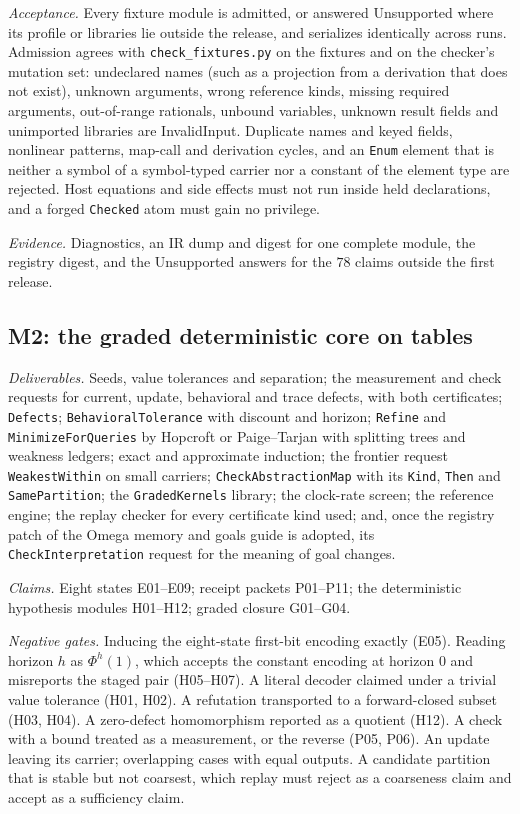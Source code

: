 \documentclass[11pt]{article}
\newcommand{\code}[1]{\texttt{#1}}
\begin{document}
\emph{Acceptance.} Every fixture module is admitted, or answered Unsupported where its profile or
libraries lie outside the release, and serializes identically across runs. Admission agrees with
\code{check\_fixtures.py} on the fixtures and on the checker's mutation set: undeclared names
(such as a projection from a derivation that does not exist), unknown arguments, wrong reference
kinds, missing required arguments, out-of-range rationals, unbound variables, unknown result fields
and unimported libraries are InvalidInput. Duplicate names and keyed fields, nonlinear patterns,
map-call and derivation cycles, and an \code{Enum} element that is neither a symbol of a symbol-typed
carrier nor a constant of the element type are rejected. Host equations and side effects must not run
inside held declarations, and a forged \code{Checked} atom must gain no privilege.

\emph{Evidence.} Diagnostics, an IR dump and digest for one complete module, the registry digest, and
the Unsupported answers for the $78$ claims outside the first release.

\subsection{M2: the graded deterministic core on tables}

\emph{Deliverables.} Seeds, value tolerances and separation; the measurement and check requests for
current, update, behavioral and trace defects, with both certificates; \code{Defects};
\code{BehavioralTolerance} with discount and horizon; \code{Refine} and \code{MinimizeForQueries} by
Hopcroft or Paige--Tarjan with splitting trees and weakness ledgers; exact and approximate induction;
the frontier request \code{WeakestWithin} on small carriers; \code{CheckAbstractionMap} with its
\code{Kind}, \code{Then} and \code{SamePartition}; the \code{GradedKernels} library; the clock-rate
screen; the reference engine; the replay checker for every certificate kind used; and, once the
registry patch of the Omega memory and goals guide is adopted, its \code{CheckInterpretation}
request for the meaning of goal changes.

\emph{Claims.} Eight states E01--E09; receipt packets P01--P11; the deterministic hypothesis modules
H01--H12; graded closure G01--G04.

\emph{Negative gates.} Inducing the eight-state first-bit encoding exactly (E05). Reading horizon
$h$ as $\Phi^h(1)$, which accepts the constant encoding at horizon $0$ and misreports the staged
pair (H05--H07). A literal decoder claimed under a trivial value tolerance (H01, H02). A refutation
transported to a forward-closed subset (H03, H04). A zero-defect homomorphism reported as a quotient
(H12). A check with a bound treated as a measurement, or the reverse (P05, P06). An update leaving its
carrier; overlapping cases with equal outputs. A candidate partition that is stable but not coarsest,
which replay must reject as a coarseness claim and accept as a sufficiency claim.
\end{document}
